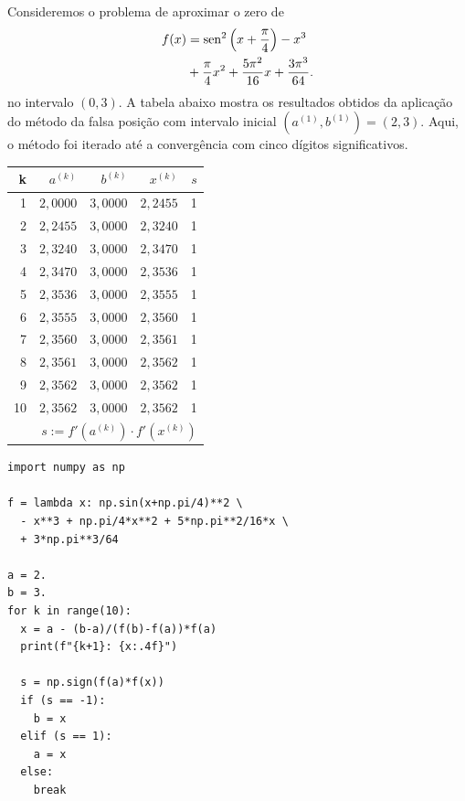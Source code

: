 \begin{ex}
  Consideremos o problema de aproximar o zero de
  \begin{equation}
    \begin{aligned}
      f(x) &= \operatorname{sen}^2\left(x+\frac{\pi}{4}\right) - x^3 \\
           &+ \frac{\pi}{4}x^2 + \frac{5\pi^2}{16}x + \frac{3\pi^3}{64}.
    \end{aligned}
\end{equation}
no intervalo $(0, 3)$. A tabela abaixo mostra os resultados obtidos da aplicação do método da falsa posição com intervalo inicial $(a^{(1)}, b^{(1)}) = (2, 3)$. Aqui, o método foi iterado até a convergência com cinco dígitos significativos.

\begin{center}
  \begin{tabular}{r|rr|r|r}
    k & $a^{(k)}$ & $b^{(k)}$ & $x^{(k)}$ & $s$\\\hline
    1 & $2,0000$ & $3,0000$ & $2,2455$ & 1 \\
    2 & $2,2455$ & $3,0000$ & $2,3240$ &  1 \\
    3 & $2,3240$ & $3,0000$ & $2,3470$ & 1 \\
    4 & $2,3470$ & $3,0000$ & $2,3536$ & 1 \\
    5 & $2,3536$ & $3,0000$ & $2,3555$ & 1 \\
    6 & $2,3555$ & $3,0000$ & $2,3560$ & 1 \\
    7 & $2,3560$ & $3,0000$ & $2,3561$ &  1 \\
    8 & $2,3561$ & $3,0000$ & $2,3562$ & 1 \\
    9 & $2,3562$ & $3,0000$ & $2,3562$ & 1 \\
    10 & $2,3562$ & $3,0000$ & $2,3562$ & 1 \\\hline
    \multicolumn{5}{r}{\small $s := f'(a^{(k)})\cdot f'(x^{(k)})$}
  \end{tabular}
\end{center}

\begin{lstlisting}
import numpy as np

f = lambda x: np.sin(x+np.pi/4)**2 \
  - x**3 + np.pi/4*x**2 + 5*np.pi**2/16*x \
  + 3*np.pi**3/64

a = 2.
b = 3.
for k in range(10):
  x = a - (b-a)/(f(b)-f(a))*f(a)
  print(f"{k+1}: {x:.4f}")

  s = np.sign(f(a)*f(x))
  if (s == -1):
    b = x
  elif (s == 1):
    a = x
  else:
    break
\end{lstlisting}
\end{ex}

